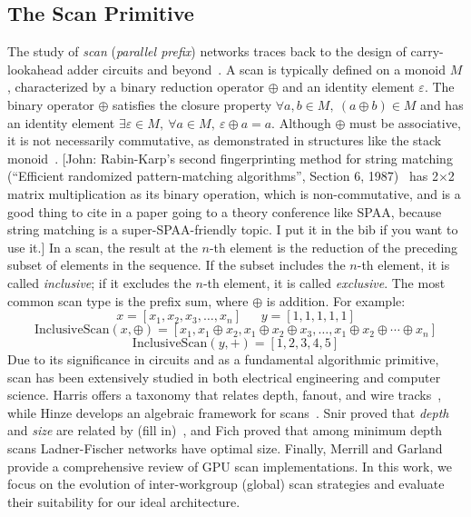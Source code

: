 \documentclass[sigconf]{acmart}
\newcommand{\john}[1]{{\footnotesize\color{cyan}[John: #1]}}
\begin{document}
\subsection{The Scan Primitive}\label{sec:the-scan-primitive}
The study of \emph{scan} (\emph{parallel prefix}) networks traces back to the design of carry-lookahead adder circuits and beyond~\cite{10.1145/322217.322232, 5219801}. A scan is typically defined on a monoid \( M \), characterized by a binary reduction operator \( \oplus \) and an identity element \( \varepsilon \). The binary operator \( \oplus \) satisfies the closure property \( \forall a, b \in M, \ (a \oplus b) \in M \) and has an identity element \( \exists \varepsilon \in M, \ \forall a \in M, \ \varepsilon \oplus a = a \). Although \( \oplus \) must be associative, it is not necessarily commutative, as demonstrated in structures like the stack monoid~\cite{}. \john{Rabin-Karp's second fingerprinting method for string matching (``Efficient randomized pattern-matching algorithms'', Section 6, 1987)~\cite[Section 6]{Karp:1987:ERP} has 2$\times$2 matrix multiplication as its binary operation, which is non-commutative, and is a good thing to cite in a paper going to a theory conference like SPAA, because string matching is a super-SPAA-friendly topic. I put it in the bib if you want to use it.} In a scan, the result at the \( n \)-th element is the reduction of the preceding subset of elements in the sequence. If the subset includes the \( n \)-th element, it is called \emph{inclusive}; if it excludes the \( n \)-th element, it is called \emph{exclusive}. The most common scan type is the prefix sum, where \( \oplus \) is addition. For example:
\[
  x = [x_1, x_2, x_3, \dots, x_n] \ \ \ \ \ \ \ y = [1, 1, 1, 1, 1]
\]
\[
  \text{InclusiveScan}(x, \oplus) = [x_1, x_1 \oplus x_2, x_1 \oplus x_2 \oplus x_3, \dots, x_1 \oplus x_2 \oplus \cdots \oplus x_n]
\]
\[
  \text{InclusiveScan}(y, +) = [1, 2, 3, 4, 5]
\]
Due to its significance in circuits and as a fundamental algorithmic primitive, scan has been extensively studied in both electrical engineering and computer science. Harris offers a taxonomy that relates depth, fanout, and wire tracks~\cite{}, while Hinze develops an algebraic framework for scans~\cite{}. Snir proved that \emph{depth} and \emph{size} are related by (fill in)~\cite{}, and Fich proved that among minimum depth scans Ladner-Fischer networks have optimal size. Finally, Merrill and Garland provide a comprehensive review of GPU scan implementations. In this work, we focus on the evolution of inter-workgroup (global) scan strategies and evaluate their suitability for our ideal architecture.
\end{document}
